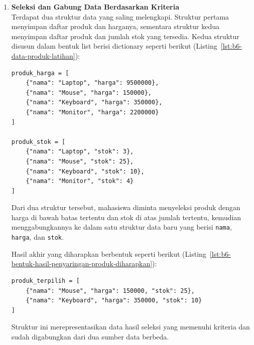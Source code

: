 \begin{enumerate}
    \begin{promptterarah}
    Saya sedang menghitung pusat massa kubus dari delapan titik berupa tuple di dalam list. Jangan tuliskan kodenya. Tanyakan cara saya mengambil koordinat x, y, dan z dari setiap tuple, lalu beri petunjuk bila keliru. Setelah saya mengirim kode, periksa dan tunjukkan bagian yang keliru tanpa memberi kode yang benar.
    \end{promptterarah}
  \item \textbf{Seleksi dan Gabung Data Berdasarkan Kriteria} \\
Terdapat dua struktur data yang saling melengkapi. 
Struktur pertama menyimpan daftar produk dan harganya, 
sementara struktur kedua menyimpan daftar produk dan jumlah stok yang tersedia. 
Kedua struktur disusun dalam bentuk list berisi dictionary seperti berikut (Listing~\ref{lst:b6-data-produk-latihan}):

\begin{lstlisting}[style=PythonStyle, caption={Data produk untuk latihan}, label={lst:b6-data-produk-latihan}]
produk_harga = [
    {"nama": "Laptop", "harga": 9500000},
    {"nama": "Mouse", "harga": 150000},
    {"nama": "Keyboard", "harga": 350000},
    {"nama": "Monitor", "harga": 2200000}
]

produk_stok = [
    {"nama": "Laptop", "stok": 3},
    {"nama": "Mouse", "stok": 25},
    {"nama": "Keyboard", "stok": 10},
    {"nama": "Monitor", "stok": 4}
]
\end{lstlisting}

Dari dua struktur tersebut, mahasiswa diminta menyeleksi produk 
dengan harga di bawah batas tertentu dan stok di atas jumlah tertentu, 
kemudian menggabungkannya ke dalam satu struktur data baru yang berisi 
\texttt{nama}, \texttt{harga}, dan \texttt{stok}. 

Hasil akhir yang diharapkan berbentuk seperti berikut (Listing~\ref{lst:b6-bentuk-hasil-penyaringan-produk-diharapkan}):

\begin{lstlisting}[style=PythonStyle, caption={Bentuk hasil penyaringan produk yang diharapkan}, label={lst:b6-bentuk-hasil-penyaringan-produk-diharapkan}]
produk_terpilih = [
    {"nama": "Mouse", "harga": 150000, "stok": 25},
    {"nama": "Keyboard", "harga": 350000, "stok": 10}
]
\end{lstlisting}

Struktur ini merepresentasikan data hasil seleksi yang memenuhi kriteria dan sudah digabungkan dari dua sumber data berbeda.



\end{enumerate}
